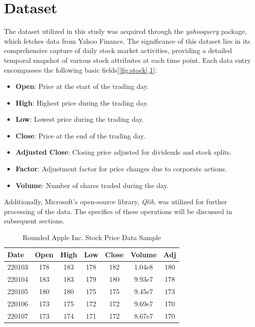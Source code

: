 \documentclass[10pt,twocolumn,letterpaper]{article}
\begin{document}
\section{Dataset}
\label{sec:dataset}
The dataset utilized in this study was acquired through the \textit{yahooquery} package, which fetches data from Yahoo Finance. The significance of this dataset lies in its comprehensive capture of daily stock market activities, providing a detailed temporal snapshot of various stock attributes at each time point. Each data entry encompasses the following basic fields[\ref{fig:stock},\ref{tab:aapl}]:
\begin{itemize}
	\item \textbf{Open}: Price at the start of the trading day.
	\item \textbf{High}: Highest price during the trading day.
	\item \textbf{Low}: Lowest price during the trading day.
	\item \textbf{Close}: Price at the end of the trading day.
	\item \textbf{Adjusted Close}: Closing price adjusted for dividends and stock splits.
	\item \textbf{Factor}: Adjustment factor for price changes due to corporate actions.
	\item \textbf{Volume}: Number of shares traded during the day.
\end{itemize}
Additionally, Microsoft's open-source library, \textit{Qlib}\cite{yang2020qlib}, was utilized for further processing of the data. The specifics of these operations will be discussed in subsequent sections.

\begin{table}[t]
	\centering
	\caption{Rounded Apple Inc. Stock Price Data Sample}
	\begin{tabularx}{\columnwidth}{lcccccc}
		\toprule
		Date   & Open & High & Low & Close & Volume & Adj \\
		\midrule
		220103 & 178  & 183  & 178 & 182   & 1.04e8 & 180 \\
		220104 & 183  & 183  & 179 & 180   & 9.93e7 & 178 \\
		220105 & 180  & 180  & 175 & 175   & 9.45e7 & 173 \\
		220106 & 173  & 175  & 172 & 172   & 9.69e7 & 170 \\
		220107 & 173  & 174  & 171 & 172   & 8.67e7 & 170 \\
		\bottomrule
	\end{tabularx}
	\label{tab:aapl}
\end{table}
\end{document}
